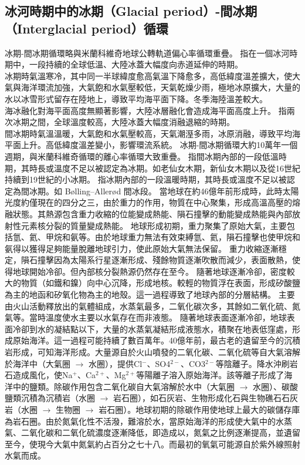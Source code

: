 \documentclass[a4paper,12pt]{report}
\begin{document}
\subsection{冰河時期中的冰期（Glacial period）-間冰期（Interglacial period）循環}
冰期-間冰期循環略與米蘭科維奇地球公轉軌道偏心率循環重疊。
指在一個冰河時期中，一段持續的全球低溫、大陸冰蓋大幅度向赤道延伸的時期。\\
冰期時氣溫寒冷，其中同一半球緯度愈高氣溫下降愈多，高低緯度溫差擴大，使大氣與海洋環流加強，大氣飽和水氣壓較低，天氣乾燥少雨，極地冰原擴大，大量的水以冰雪形式留存在陸地上，導致平均海平面下降。冬季海陸溫差較大。\\
海冰融化對海平面高度無顯著影響，大陸冰層融化會造成海平面高度上升。
指兩次冰期之間，全球溫度較高，大陸冰蓋大幅度消融退縮的時期。\\
間冰期時氣溫溫暖，大氣飽和水氣壓較高，天氣潮溼多雨，冰原消融，導致平均海平面上升。高低緯度溫差變小，影響環流系統。
冰期-間冰期循環大約10萬年一個週期，與米蘭科維奇循環的離心率循環大致重疊。
指間冰期內部的一段低溫時期，其時長或溫度不足以被認定為冰期。如老仙女木期，新仙女木期以及從16世紀持續到19世紀的小冰期。
指冰期內部的一段溫暖時期，其時長或溫度不足以被認定為間冰期。如 Bølling–Allerød 間冰段。
當地球在約46億年前形成時，此時太陽光度約僅現在的四分之三，由於重力的作用，物質在中心聚集，形成高溫高壓的熔融狀態。其熱源包含重力收縮的位能變成熱能、隕石撞擊的動能變成熱能與內部放射性元素核分裂的質量變成熱能。
地球形成初期，重力聚集了原始大氣，主要包括氫、氦、甲烷和氨等。由於地球重力無法有效束縛氫、氦，隕石撞擊也使甲烷和氨得以獲得足夠能量脫離地球引力，使此原始大氣無法保留。
重力收縮逐漸穩定，隕石撞擊因為太陽系行星逐漸形成、殘餘物質逐漸吹散而減少，表面散熱，使得地球開始冷卻。但內部核分裂熱源仍然存在至今。
隨著地球逐漸冷卻，密度較大的物質（如鐵和鎳）向中心沉降，形成地核。較輕的物質浮在表面，形成矽酸鹽為主的地函和矽氧化物為主的地殼。這一過程導致了地球內部的分層結構。
主要由火山活動釋放出的氣體組成，水蒸氣最多，二氧化碳次多，其餘如二氧化硫、氮氣等。當時溫度使水主要以水氣存在而非液態。
隨著地球表面逐漸冷卻，地球表面冷卻到水的凝結點以下，大量的水蒸氣凝結形成液態水，積聚在地表低窪處，形成原始海洋。這一過程可能持續了數百萬年。40億年前，最古老的遺留至今的沉積岩形成，可知海洋形成。大量源自於火山噴發的二氧化碳、二氧化硫等自大氣溶解於海洋中（大氣圈 $\rightarrow$ 水圈），提供Cl$^-$、SO4$^{2-}$、CO3$^{2-}$等陰離子。降水沖刷岩石造成風化，使Na$^+$、Ca$^{2+}$、Mg$^{2+}$等陽離子溶入原始海洋。該等離子形成了海洋中的鹽類。除碳作用包含二氧化碳自大氣溶解於水中（大氣圈 $\rightarrow$ 水圈）、碳酸鹽類沉積為沉積岩（水圈 $\rightarrow$ 岩石圈），如石灰岩、生物形成化石與生物礁石石灰岩（水圈 $\rightarrow$ 生物圈 $\rightarrow$ 岩石圈）。地球初期的除碳作用使地球上最大的碳儲存庫為岩石圈。由於氮氣化性不活潑，難溶於水，當原始海洋的形成使大氣中的水蒸氣、二氧化碳和二氧化硫濃度逐漸降低，即造成以，氮氣之比例逐漸提高，並遺留至今，使現今大氣中氮氣約占百分之七十八。而最初的氧氣可能源自於紫外線照射水氣而成。
\end{document}
